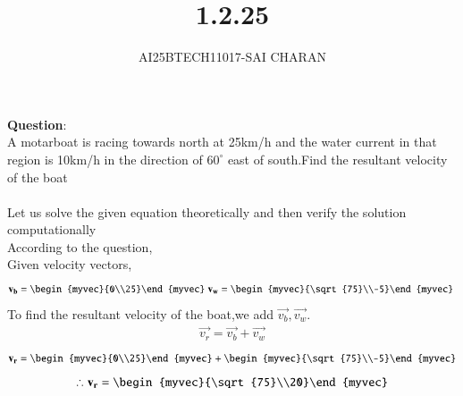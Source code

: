 \documentclass[journal]{IEEEtran}
\begin{document}

\vspace{3cm}

\title{1.2.25}
\author{AI25BTECH11017-SAI CHARAN}
 \maketitle
{\let\newpage\relax\maketitle}
\renewcommand{\thefigure}{\theenumi}
\renewcommand{\thetable}{\theenumi}
\setlength{\intextsep}{10pt} %
\renewcommand{\thetable}{\theenumi}
\textbf{Question}:\\
A motarboat is racing towards north at 25km/h and the water current in that  region is 10km/h in the direction of $60^\circ$
east of south.Find the resultant velocity of the boat\\ 
\solution \\
Let us solve the given equation theoretically and then verify the solution computationally \\
According to the question, \\
Given velocity vectors,
\begin{align}
    \vec{v_b}=\begin{myvec}{0\\25}\end{myvec}\;
    \vec{v_w}=\begin{myvec}{\sqrt{75}\\-5}\end{myvec}\
\end{align}
To find the resultant velocity of the boat,we add $\vec{v_b} ,\vec{v_w}$.\\

\begin{align}
    \vec{v_r}=\vec{v_b}+\vec{v_w}
\end{align}
\begin{align}
    \vec{v_r}=\begin{myvec}{0\\25}\end{myvec}+\begin{myvec}{\sqrt{75}\\-5}\end{myvec}
\end{align}
\begin{align}
    \therefore\vec{v_r}=\begin{myvec}{\sqrt{75}\\20}\end{myvec}
\end{align}
\end{document}
